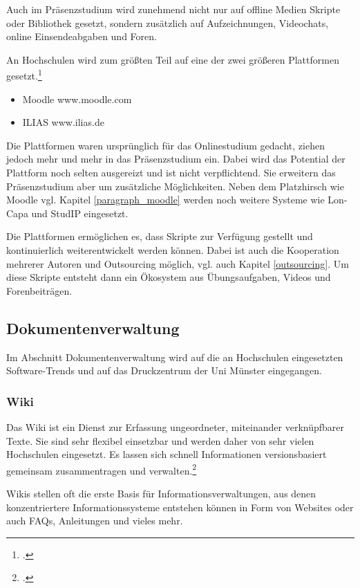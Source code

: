 Auch im Präsenzstudium wird zunehmend nicht nur auf offline Medien Skripte oder Bibliothek gesetzt, sondern zusätzlich auf Aufzeichnungen, Videochats, online Einsendeabgaben und Foren.

An Hochschulen wird zum gr\"oßten Teil auf eine der zwei größeren Plattformen gesetzt.\footcite{oevel_lange_2008}

\begin{itemize}
	\item Moodle www.moodle.com
	\item ILIAS www.ilias.de
\end{itemize}

Die Plattformen waren ursprünglich für das Onlinestudium gedacht, ziehen jedoch mehr und mehr in das Präsenzstudium ein. Dabei wird das Potential der Plattform noch selten ausgereizt und ist nicht verpflichtend. Sie erweitern das Präsenzstudium aber um zusätzliche Möglichkeiten.
Neben dem Platzhirsch wie Moodle vgl. Kapitel \ref{paragraph_moodle} werden noch weitere Systeme wie Lon-Capa und StudIP eingesetzt.

Die Plattformen ermöglichen es, dass Skripte zur Verfügung gestellt und kontinuierlich weiterentwickelt werden können. Dabei ist auch die Kooperation mehrerer Autoren und Outsourcing möglich, vgl. auch Kapitel \ref{outsourcing}. Um diese Skripte entsteht dann ein Ökosystem aus Übungsaufgaben, Videos und Forenbeiträgen.



\subsection{Dokumentenverwaltung}
\label{dokumentenverwaltungssysteme}
Im Abschnitt Dokumentenverwaltung wird auf die an Hochschulen eingesetzten Software-Trends und auf das Druckzentrum der Uni Münster eingegangen.


\subsubsection{Wiki}
Das Wiki ist ein Dienst zur Erfassung ungeordneter, miteinander verknüpfbarer Texte. Sie sind sehr flexibel einsetzbar und werden daher von sehr vielen Hochschulen eingesetzt. Es lassen sich schnell Informationen versionsbasiert gemeinsam zusammentragen und verwalten.\footcite[Vgl.][65]{schmidtjh_2013}

Wikis stellen oft die erste Basis für Informationsverwaltungen, aus denen konzentriertere Informationssysteme entstehen können in Form von Websites oder auch FAQs, Anleitungen und vieles mehr.


